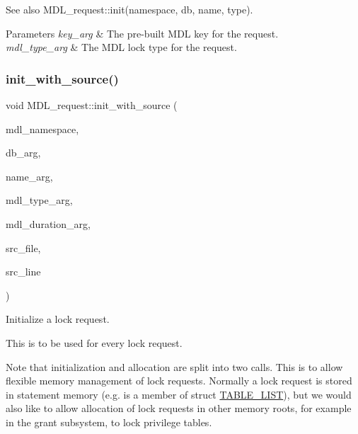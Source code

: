 \begin{DoxySeeAlso}{See also}
M\+D\+L\+\_\+request\+::init(namespace, db, name, type).
\end{DoxySeeAlso}

\begin{DoxyParams}{Parameters}
{\em key\+\_\+arg} & The pre-\/built M\+DL key for the request. \\
\hline
{\em mdl\+\_\+type\+\_\+arg} & The M\+DL lock type for the request. \\
\hline
\end{DoxyParams}
\mbox{\label{classMDL__request_ab04208d9a63353d65b5384b2352657ea}} 
\subsubsection{\texorpdfstring{init\+\_\+with\+\_\+source()}{init\_with\_source()}}
{\footnotesize\ttfamily void M\+D\+L\+\_\+request\+::init\+\_\+with\+\_\+source (\begin{DoxyParamCaption}\item[{\mbox{\hyperlink{structMDL__key_a391ec4bd98fec6852a48f7856546ed3b}{M\+D\+L\+\_\+key\+::enum\+\_\+mdl\+\_\+namespace}}}]{mdl\+\_\+namespace,  }\item[{const char $\ast$}]{db\+\_\+arg,  }\item[{const char $\ast$}]{name\+\_\+arg,  }\item[{enum\+\_\+mdl\+\_\+type}]{mdl\+\_\+type\+\_\+arg,  }\item[{enum\+\_\+mdl\+\_\+duration}]{mdl\+\_\+duration\+\_\+arg,  }\item[{const char $\ast$}]{src\+\_\+file,  }\item[{uint}]{src\+\_\+line }\end{DoxyParamCaption})}

Initialize a lock request.

This is to be used for every lock request.

Note that initialization and allocation are split into two calls. This is to allow flexible memory management of lock requests. Normally a lock request is stored in statement memory (e.\+g. is a member of struct \mbox{\hyperlink{structTABLE__LIST}{T\+A\+B\+L\+E\+\_\+\+L\+I\+ST}}), but we would also like to allow allocation of lock requests in other memory roots, for example in the grant subsystem, to lock privilege tables.

